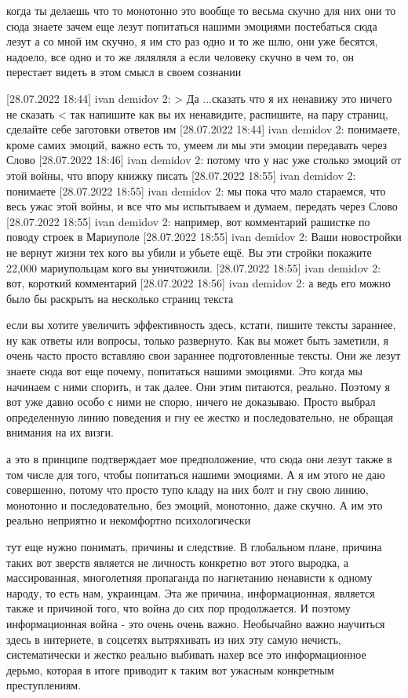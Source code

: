 когда ты делаешь что то монотонно
это вообще то весьма скучно
для них
они то сюда знаете зачем еще лезут
попитаться нашими эмоциями
постебаться сюда лезут
а со мной им скучно, я им сто раз одно и то же шлю, они уже бесятся, надоело, все одно и то же ляляляля
а если человеку скучно в чем то, он перестает видеть в этом смысл в своем сознании

[28.07.2022 18:44] ivan demidov 2: 
> Да ...сказать что я их ненавижу это ничего не сказать <
так напишите как вы их ненавидите, распишите, на пару страниц, сделайте себе заготовки ответов им
[28.07.2022 18:44] ivan demidov 2: понимаете, кроме самих эмоций, важно есть то, умеем ли мы эти эмоции передавать через Слово
[28.07.2022 18:46] ivan demidov 2: потому что у нас уже столько эмоций от этой войны, что впору книжку писать
[28.07.2022 18:55] ivan demidov 2: понимаете
[28.07.2022 18:55] ivan demidov 2: мы пока что мало стараемся, что весь ужас этой войны, и все что мы испытываем и думаем, передать через Слово
[28.07.2022 18:55] ivan demidov 2: например, вот комментарий рашистке по поводу строек в Мариуполе
[28.07.2022 18:55] ivan demidov 2: Ваши новостройки не вернут жизни тех кого вы убили и убьете ещё. Вы эти стройки
покажите 22,000 мариупольцам кого вы уничтожили.
[28.07.2022 18:55] ivan demidov 2: вот, короткий комментарий
[28.07.2022 18:56] ivan demidov 2: а ведь его можно было бы раскрыть на несколько страниц текста

если вы хотите увеличить эффективность здесь, кстати, пишите тексты зараннее,
ну как ответы или вопросы, только развернуто. Как вы может быть заметили, я
очень часто просто вставляю свои зараннее подготовленные тексты. Они же лезут
знаете сюда вот еще почему, попитаться нашими эмоциями. Это когда мы начинаем с
ними спорить, и так далее. Они этим питаются, реально. Поэтому я вот уже давно
особо с ними не спорю, ничего не доказываю. Просто выбрал определенную линию
поведения и гну ее жестко и последовательно, не обращая внимания на их визги.

а это в принципе подтверждает мое предположение, что сюда они лезут также в том
числе для того, чтобы попитаться нашими эмоциями. А я им этого не даю
совершенно, потому что просто тупо кладу на них болт и гну свою линию,
монотонно и последовательно, без эмоций, монотонно, даже скучно. А им это
реально неприятно и некомфортно психологически

тут еще нужно понимать, причины и следствие. В глобальном плане, причина таких
вот зверств является не личность конкретно вот этого выродка, а массированная,
многолетняя пропаганда по нагнетанию ненависти к одному народу, то есть нам,
украинцам. Эта же причина, информационная, является также и причиной того, что
война до сих пор продолжается. И поэтому информационная война - это очень очень
важно. Необычайно важно научиться здесь в интернете, в соцсетях вытряхивать из
них эту самую нечисть, систематически и жестко реально выбивать нахер все это
информационное дерьмо, которая в итоге приводит к таким вот ужасным конкретным
преступлениям.


